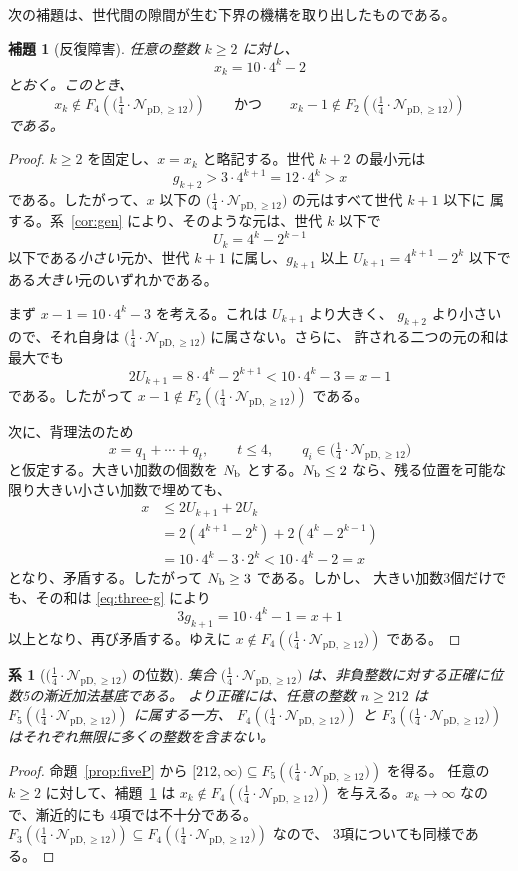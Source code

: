 \documentclass[12pt]{ltjsarticle}
\theoremstyle{plain}
\newtheorem{lemma}[theorem]{補題}
\newtheorem{corollary}[theorem]{系}
\theoremstyle{definition}
\theoremstyle{plain}
\newcommand{\Pset}{%
  \bigl(\tfrac{1}{4}\cdot\mathcal{N}_{\mathrm{pD},\geq 12}\bigr)%
}
\begin{document}
次の補題は、世代間の隙間が生む下界の機構を取り出したものである。

\begin{lemma}[反復障害]\label{lem:obstruction}
任意の整数 $k\geq2$ に対し、
\[
 x_k=10\cdot4^k-2
\]
とおく。このとき、
\begin{equation}\label{eq:obstruction}
 x_k\notin F_4(\Pset)
 \qquad\text{かつ}\qquad
 x_k-1\notin F_2(\Pset)
\end{equation}
である。
\end{lemma}

\begin{proof}
$k\geq2$ を固定し、$x=x_k$ と略記する。世代 $k+2$ の最小元は
\[
 g_{k+2}>3\cdot4^{k+1}=12\cdot4^k>x
\]
である。したがって、$x$ 以下の $\Pset$ の元はすべて世代 $k+1$ 以下に
属する。系~\ref{cor:gen} により、そのような元は、世代 $k$ 以下で
\[
 U_k=4^k-2^{k-1}
\]
以下である\emph{小さい}元か、世代 $k+1$ に属し、$g_{k+1}$ 以上
$U_{k+1}=4^{k+1}-2^k$ 以下である\emph{大きい}元のいずれかである。

まず $x-1=10\cdot4^k-3$ を考える。これは $U_{k+1}$ より大きく、
$g_{k+2}$ より小さいので、それ自身は $\Pset$ に属さない。さらに、
許される二つの元の和は最大でも
\[
 2U_{k+1}=8\cdot4^k-2^{k+1}<10\cdot4^k-3=x-1
\]
である。したがって $x-1\notin F_2(\Pset)$ である。

次に、背理法のため
\[
 x=q_1+\cdots+q_t,
 \qquad t\leq4,
 \qquad q_i\in\Pset
\]
と仮定する。大きい加数の個数を $N_{\rm b}$ とする。$N_{\rm b}\leq2$
なら、残る位置を可能な限り大きい小さい加数で埋めても、
\begin{align*}
 x
 &\leq2U_{k+1}+2U_k\\
 &=2(4^{k+1}-2^k)+2(4^k-2^{k-1})\\
 &=10\cdot4^k-3\cdot2^k
 <10\cdot4^k-2=x
\end{align*}
となり、矛盾する。したがって $N_{\rm b}\geq3$ である。しかし、
大きい加数3個だけでも、その和は \eqref{eq:three-g} により
\[
 3g_{k+1}=10\cdot4^k-1=x+1
\]
以上となり、再び矛盾する。ゆえに $x\notin F_4(\Pset)$ である。
\end{proof}

\begin{corollary}[$\Pset$ の位数]\label{cor:orderfive}
集合 $\Pset$ は、非負整数に対する正確に位数5の漸近加法基底である。
より正確には、任意の整数 $n\geq212$ は $F_5(\Pset)$ に属する一方、
$F_4(\Pset)$ と $F_3(\Pset)$ はそれぞれ無限に多くの整数を含まない。
\end{corollary}

\begin{proof}
命題~\ref{prop:fiveP} から $[212,\infty)\subseteq F_5(\Pset)$ を得る。
任意の $k\geq2$ に対して、補題~\ref{lem:obstruction} は
$x_k\notin F_4(\Pset)$ を与える。$x_k\to\infty$ なので、漸近的にも
4項では不十分である。$F_3(\Pset)\subseteq F_4(\Pset)$ なので、
3項についても同様である。
\end{proof}
\end{document}
